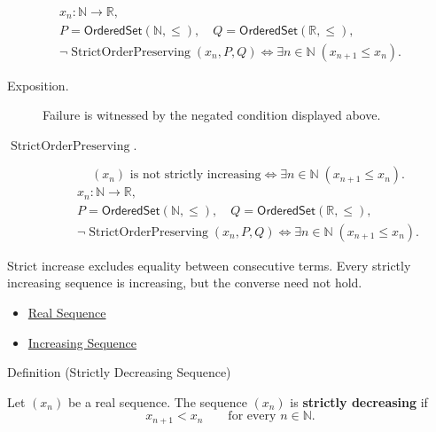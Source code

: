 \begin{remark*}
\[
\begin{gathered}
x_n\colon\mathbb{N}\to\mathbb{R},\\
P=\mathsf{OrderedSet}(\mathbb{N},\leq),\quad
Q=\mathsf{OrderedSet}(\mathbb{R},\leq),\\
\neg\operatorname{StrictOrderPreserving}(x_n,P,Q)
\Longleftrightarrow
\exists n\in\mathbb{N}\;(x_{n+1}\le x_n).
\end{gathered}
\]
\end{remark*}
\begin{remark*}
\begin{description}
  \item[Exposition.]
Failure is witnessed by the negated condition displayed above.
  \item[\(\operatorname{StrictOrderPreserving}.\)]
\[
(x_n)\text{ is not strictly increasing}
\Longleftrightarrow
\exists n\in\mathbb{N}\;(x_{n+1}\le x_n).
\]
\[
\begin{gathered}
x_n\colon\mathbb{N}\to\mathbb{R},\\
P=\mathsf{OrderedSet}(\mathbb{N},\leq),\quad
Q=\mathsf{OrderedSet}(\mathbb{R},\leq),\\
\neg\operatorname{StrictOrderPreserving}(x_n,P,Q)
\Longleftrightarrow
\exists n\in\mathbb{N}\;(x_{n+1}\le x_n).
\end{gathered}
\]
\end{description}
\end{remark*}

\begin{remark*}[Interpretation]
Strict increase excludes equality between consecutive terms. Every strictly
increasing sequence is increasing, but the converse need not hold.
\end{remark*}

\begin{dependencies}
\begin{itemize}
  \item \hyperref[def:real-sequence]{Real Sequence}
  \item \hyperref[def:increasing-sequence]{Increasing Sequence}
\end{itemize}
\end{dependencies}


\begin{definitionbox}{Definition (Strictly Decreasing Sequence)}
\begin{definition}
\label{def:strictly-decreasing-sequence}
Let $(x_n)$ be a real sequence. The sequence $(x_n)$ is
\textbf{strictly decreasing} if
\[
  x_{n+1} < x_n
  \qquad
  \text{for every } n\in\mathbb{N}.
\]
\end{definition}
\end{definitionbox}

